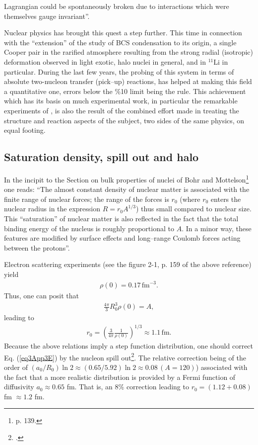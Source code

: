 Lagrangian could be spontaneously broken due to interactions which were themselves gauge invariant''.


Nuclear physics has brought this quest a step further. This time in connection with the ``extension'' of the study of BCS condensation to its origin, a single Cooper pair in the rarified atmosphere resulting from the strong radial (isotropic) deformation observed in light exotic, halo nuclei in general, and in $^{11}$Li in particular. During the last few years, the probing of this system in terms of absolute two-nucleon transfer (pick--up) reactions, has helped at making this field a quantitative one, errors below the \%10 limit being the rule. This achievement which has its basis on much experimental work, in particular the remarkable experiments of \cite{Tanihata:08}, is also the result of the combined effort made in treating the structure and reaction aspects of the subject, two sides of the same physics, on equal footing. 
\subsection{Saturation density, spill out and halo}
In the incipit to the Section on bulk properties of nuclei of Bohr and Mottelson\footnote{ \cite{Bohr:69} p. 139.} one reads: ``The almost constant density of nuclear matter is associated with the finite range of nuclear forces; the range of the forces is $r_0$ (where $r_0$ enters the nuclear radius in the expression $R=r_0A^{1/3}$) thus small compared to nuclear size. This ``saturation'' of nuclear matter is also reflected in the fact that the total binding energy of the nucleus is roughly proportional to $A$. In a minor way, these features are modified by surface effects and long--range Coulomb forces acting between the protons''.



Electron scattering experiments (see the figure 2-1, p. 159 of the above reference) yield
\begin{align}
\rho(0)=0.17\,\text{fm}^{-3}.
\end{align}
Thus, one can posit that
\begin{align}
\frac{4\pi}{3}R_0^3\rho(0)=A,
\end{align}
leading to
\begin{align}\label{eq3App3E}
r_0=\left(\frac{3}{4\pi}\frac{1}{\rho(0)}\right)^{1/3}\approx 1.1\,\text{fm}.
\end{align}
Because the above relations imply a step function distribution, one should correct Eq. (\ref{eq3App3E}) by the nucleon spill out\footnote{\cite{Bertsch:05}.}. The relative correction being of the order of $(a_0/R_0)\ln 2\approx (0.65/5.92)\ln 2\approx 0.08\, (A=120)$) associated with the fact that a more realistic distribution is provided by a Fermi function of diffusivity $a_0\approx 0.65$ fm. That is, an 8\% correction leading to $r_0=(1.12+0.08)$ fm $\approx 1.2$ fm. 



